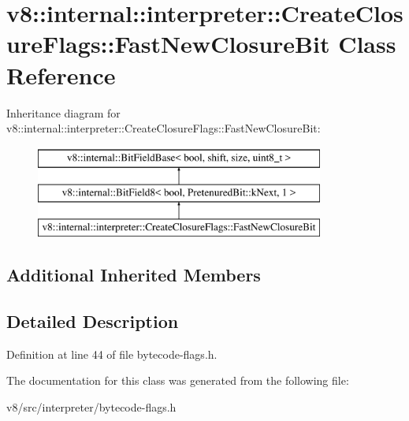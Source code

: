 \hypertarget{classv8_1_1internal_1_1interpreter_1_1CreateClosureFlags_1_1FastNewClosureBit}{}\section{v8\+:\+:internal\+:\+:interpreter\+:\+:Create\+Closure\+Flags\+:\+:Fast\+New\+Closure\+Bit Class Reference}
\label{classv8_1_1internal_1_1interpreter_1_1CreateClosureFlags_1_1FastNewClosureBit}
Inheritance diagram for v8\+:\+:internal\+:\+:interpreter\+:\+:Create\+Closure\+Flags\+:\+:Fast\+New\+Closure\+Bit\+:\begin{figure}[H]
\begin{center}
\leavevmode
\includegraphics[height=3.000000cm]{classv8_1_1internal_1_1interpreter_1_1CreateClosureFlags_1_1FastNewClosureBit}
\end{center}
\end{figure}
\subsection*{Additional Inherited Members}


\subsection{Detailed Description}


Definition at line 44 of file bytecode-\/flags.\+h.



The documentation for this class was generated from the following file\+:\begin{DoxyCompactItemize}
\item 
v8/src/interpreter/bytecode-\/flags.\+h\end{DoxyCompactItemize}
